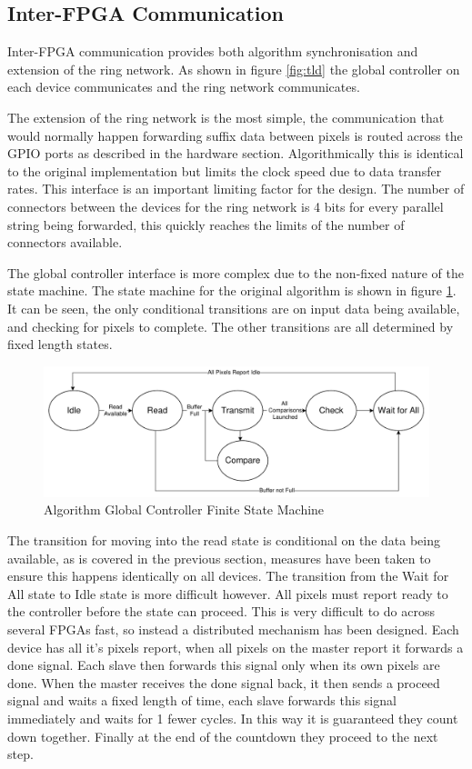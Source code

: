 \subsection{Inter-FPGA Communication}

Inter-FPGA communication provides both algorithm synchronisation and extension of the ring network. As shown in figure \ref{fig:tld} the global controller on each device communicates and the ring network communicates.

The extension of the ring network is the most simple, the communication that would normally happen forwarding suffix data between pixels is routed across the GPIO ports as described in the hardware section. Algorithmically this is identical to the original implementation but limits the clock speed due to data transfer rates. This interface is an important limiting factor for the design. The number of connectors between the devices for the ring network is 4 bits for every parallel string being forwarded, this quickly reaches the limits of the number of connectors available. 


The global controller interface is more complex due to the non-fixed nature of the state machine. The state machine for the original algorithm is shown in figure \ref{fig:ctrlfsm}. It can be seen, the only conditional transitions are on input data being available, and checking for pixels to complete. The other transitions are all determined by fixed length states. 


\begin{figure}[!h]
  \centering
  \includegraphics[width=\textwidth]{./figs/ctrl_fsm.pdf}
  \caption{Algorithm Global Controller Finite State Machine}
  \label{fig:ctrlfsm}
\end{figure}


The transition for moving into the read state is conditional on the data being available, as is covered in the previous section, measures have been taken to ensure this happens identically on all devices. The transition from the Wait for All state to Idle state is more difficult however. All pixels must report ready to the controller before the state can proceed. This is very difficult to do across several FPGAs fast, so instead a distributed mechanism has been designed. Each device has all it's pixels report, when all pixels on the master report  it forwards a done signal. Each slave then forwards this signal only when its own pixels are done. When the master receives the done signal back, it then sends a proceed signal and waits a fixed length of time, each slave forwards this signal immediately and waits for 1 fewer cycles. In this way it is guaranteed they count down together. Finally at the end of the countdown they proceed to the next step.

